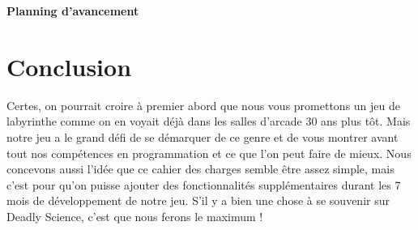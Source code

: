 \documentclass{article}
\begin{document}
\begin{center}
	\bf{Planning d'avancement}
\end{center}


\newpage
\section{Conclusion}

Certes, on pourrait croire à premier abord que nous vous promettons un jeu de labyrinthe comme on en voyait déjà dans les salles d’arcade 30 ans plus tôt. Mais notre jeu a le grand défi de se démarquer de ce genre et de vous montrer avant tout nos compétences en programmation et ce que l’on peut faire de mieux. Nous concevons aussi l’idée que ce cahier des charges semble être assez simple, mais c’est pour qu’on puisse ajouter des fonctionnalités supplémentaires durant les 7 mois de développement de notre jeu. S’il y a bien une chose à se souvenir sur Deadly Science, c’est que nous ferons le maximum !
\end{document}
